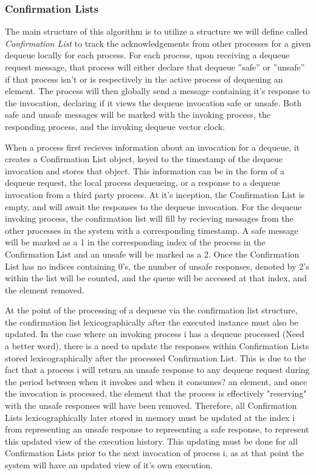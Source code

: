 \documentclass[a4paper,USenglish]{lipics-v2021} %
\begin{document}
\subsubsection{Confirmation Lists}
The main structure of this algorithm is to utilize a structure we will define called \emph{Confirmation List} to track the acknowledgements from other processes for a given dequeue locally for each process.  For each process, upon receiving a dequeue request message, that process will either declare that dequeue ”safe” or ”unsafe” if that process isn't or is respectively in the active process of dequeuing an element. The process will then globally send a message containing it's response to the invocation, declaring if it views the dequeue invocation safe or unsafe. Both safe and unsafe messages will be marked with the invoking process, the responding process, and the invoking dequeue vector clock.

When a process first recieves information about an invocation for a dequeue, it creates a Confirmation List object, keyed to the timestamp of the dequeue invocation and stores that object. This information can be in the form of a dequeue request, the local process dequeueing, or a response to a dequeue invocation from a third party process. At it's inception, the Confirmation List is empty, and will await the responses to the dequeue invocation. For the dequeue invoking process, the confirmation list will fill by recieving messages from the other processes in the system with a corresponding timestamp. A safe message will be marked as a 1 in the corresponding index of the process in the Confirmation List and an unsafe will be marked as a 2. Once the Confirmation List has no indices containing 0's, the number of unsafe responses, denoted by 2's within the list will be counted, and the queue will be accessed at that index, and the element removed.

At the point of the processing of a dequeue via the confirmation list structure, the confirmation list lexicographically after the executed instance must also be updated. In the case where an invoking process i has a dequeue processed (Need a better word), there is a need to update the responses within Confirmation Lists stored lexicographically after the processed Confirmation List. This is due to the fact that a process i will return an unsafe response to any dequeue request during the period between when it invokes and when it consumes? an element, and once the invocation is processed, the element that the process is effectively "reserving" with the unsafe responses will have been removed. Therefore, all Confirmation Lists lexicographically later stored in memory must be updated at the index i from representing an unsafe response to representing a safe response, to represent this updated view of the execution history. This updating must be done for all Confirmation Lists prior to the next invocation of process i, as at that point the system will have an updated view of it's own execution.
\end{document}
